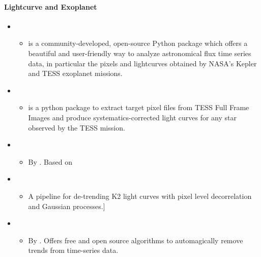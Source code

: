 \documentclass[letterpaper,10pt,english]{sphinxmanual}
\begin{document}
\paragraph{Lightcurve and Exoplanet}
\label{\detokenize{resource/astro/topics/transient_and_time_domain:lightcurve-and-exoplanet}}\begin{itemize}
\item {} 
\begin{itemize}
\item {} 
 is a community-developed, open-source Python
package which offers a beautiful and user-friendly way to analyze
astronomical flux time series data, in particular the pixels and
lightcurves obtained by NASA’s Kepler and TESS exoplanet missions.

\end{itemize}

\item {} 
\begin{itemize}
\item {} 
 is a python package to extract target pixel files from
TESS Full Frame Images and produce systematics-corrected light
curves for any star observed by the TESS mission.

\end{itemize}

\item {} 
\begin{itemize}
\item {} 
By . Based on 

\end{itemize}

\item {} 
\begin{itemize}
\item {} 
A pipeline for de-trending K2 light curves with pixel level
decorrelation and Gaussian processes.{]}

\end{itemize}

\item {} 
\begin{itemize}
\item {} 
By . Offers free and
open source algorithms to automagically remove trends from
time-series data.

\end{itemize}

\end{itemize}
\end{document}
